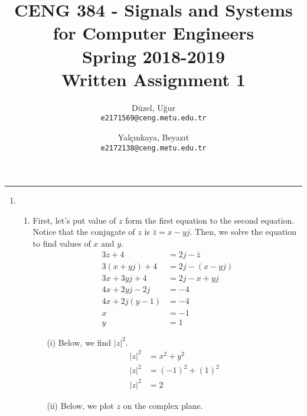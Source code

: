 \documentclass[10pt,a4paper, margin=1in]{article}
\author{
  Düzel, Uğur\\
  \texttt{e2171569@ceng.metu.edu.tr}
  \and
  Yalçınkaya, Beyazıt\\
  \texttt{e2172138@ceng.metu.edu.tr}
}
\title{CENG 384 - Signals and Systems for Computer Engineers \\
Spring 2018-2019 \\
Written Assignment 1}
\begin{document}
\maketitle



\noindent\rule{19cm}{1.2pt}

\begin{enumerate}

\item 
    \begin{enumerate}
    \item %
    	First, let's put value of $z$ form the first equation to the second equation. Notice that the conjugate of $z$ is $\bar{z} = x -yj$. Then, we solve the equation to find values of $x$ and $y$.
    	\begin{equation}
	\begin{split}
		3z + 4 & = 2j - \bar{z}\\
		3(x + yj) + 4 & = 2j - (x - yj)\\
		3x + 3yj + 4 & = 2j - x + yj\\
		4x + 2yj - 2j & = -4\\
		4x + 2j(y - 1) & = -4\\
		x & = -1\\
		y & = 1
	\end{split}
	\end{equation}
	
	\begin{itemize}
		\item[(i)] Below, we find $|z|^2$.
            		\begin{equation}
	       	 	\begin{split}
        				|z|^2 & = x^2 + y^2\\
        				|z|^2 & = (-1)^2 + (1)^2\\
        				|z|^2 & = 2
	        		\end{split}
       		 	\end{equation}
		\item[(ii)] Below, we plot $z$ on the complex plane.

\begin{figure}[!htbp]
\begin{center}
\end{center}
\end{figure}
\end{itemize}
\end{enumerate}
\end{enumerate}
\end{document}
